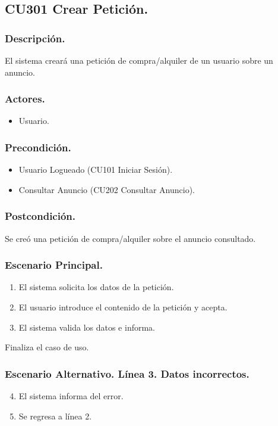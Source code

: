 \subsection{CU301 Crear Petici\'{o}n.}
\subsubsection{Descripci\'{o}n.}
El sistema crear\'{a} una petici\'{o}n de compra/alquiler de un usuario sobre un anuncio.
\subsubsection{Actores.}
\begin{itemize}
\item Usuario.
\end{itemize}
\subsubsection{Precondici\'{o}n.}
\begin{itemize}
\item Usuario Logueado (CU101 Iniciar Sesi\'{o}n).
\item Consultar Anuncio (CU202 Consultar Anuncio).
\end{itemize}
\subsubsection{Postcondici\'{o}n.}
Se cre\'{o} una petici\'{o}n de compra/alquiler sobre el anuncio consultado.
\subsubsection{Escenario Principal.}
\begin{enumerate}
\item El sistema solicita los datos de la petici\'{o}n.
\item El usuario introduce el contenido de la petici\'{o}n y acepta.
\item El sistema valida los datos e informa.
\end{enumerate}
Finaliza el caso de uso.
\subsubsection{Escenario Alternativo. L\'{i}nea 3. Datos incorrectos.}
\begin{enumerate}
\setcounter{enumi}{3}
\item El sistema informa del error.
\item Se regresa a l\'{i}nea 2.
\end{enumerate}
